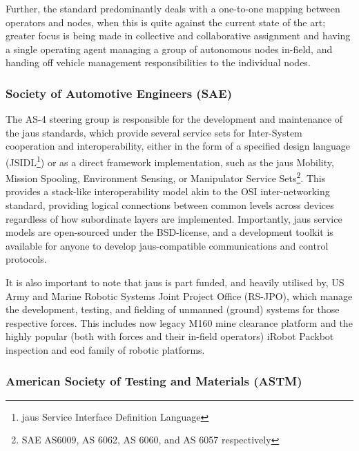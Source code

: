 Further, the standard predominantly deals with a one-to-one mapping between operators and nodes, when this is quite against the current state of the art; greater focus is being made in collective and collaborative assignment and having a single operating agent managing a group of autonomous nodes in-field, and handing off vehicle management responsibilities to the individual nodes.

\subsubsection{Society of Automotive Engineers (SAE)}

The AS-4 steering group is responsible for the development and maintenance of the \gls{jaus} standards, which provide several service sets for Inter-System cooperation and interoperability, either in the form of a specified design language (JSIDL\footnote{\gls{jaus} Service Interface Definition Language}) or as a direct framework implementation, such as the \gls{jaus} Mobility, Mission Spooling, Environment Sensing, or Manipulator Service Sets\footnote{SAE AS6009, AS 6062, AS 6060, and AS 6057 respectively}.
This provides a stack-like interoperability model akin to the OSI inter-networking standard, providing logical connections between common levels across devices regardless of how subordinate layers are implemented.
Importantly, \gls{jaus} service models are open-sourced under the BSD-license, and a development toolkit is available for anyone to develop \gls{jaus}-compatible communications and control protocols\cite{JTS}.

It is also important to note that \gls{jaus} is part funded, and heavily utilised by, US Army and Marine Robotic Systems Joint Project Office (RS-JPO), which manage the development, testing, and fielding of unmanned (ground) systems for those respective forces.
This includes now legacy M160 mine clearance platform and the highly popular (both with forces and their in-field operators) iRobot Packbot inspection and \gls{eod} family of robotic platforms.

\subsubsection{American Society of Testing and Materials (ASTM)}

